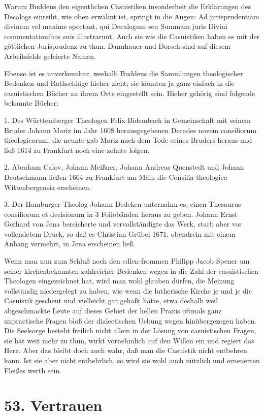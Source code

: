 Warum Buddeus den eigentlichen Casuistiken insonderheit die Erklärungen des Decalogs einreiht, wie oben erwähnt
ist, springt in die Augen: Ad jurisprudentiam divinam vel maxime spectant, qui Decalogum seu Summam juris Divini commentationibus suis illustrarunt. Auch sie wie die Casuistiken haben es mit der göttlichen Jurisprudenz zu thun. Dannhauer und Dorsch sind auf diesem Arbeitsfelde gefeierte Namen.

Ebenso ist es unverkennbar, weshalb Buddeus die Sammlungen theologischer Bedenken und Rathschläge hieher zieht; sie könnten ja ganz einfach in die casuistischen Bücher an ihrem Orte eingestellt sein. Hieher gehörig sind folgende bekannte Bücher:

1. Des Württemberger Theologen Felix Bidembach in Gemeinschaft mit seinem Bruder Johann Moriz im Jahr 1608 herausgegebenen Decades novem consiliorum theologicorum; die neunte gab Moriz nach dem Tode seines Bruders heraus und ließ 1614 zu Frankfurt noch eine zehnte folgen.

2. Abraham Calov, Johann Meißner, Johann Andreas Quenstedt und Johann Deutschmann ließen 1664 zu Frankfurt am Main die Consilia theologica Wittenbergensia erscheinen.

3. Der Hamburger Theolog Johann Dedeken unternahm es, einen Thesaurus consiliorum et decisionum in 3 Foliobänden heraus zu geben. Johann Ernst Gerhard von Jena bereicherte und vervollständigte das Werk, starb aber vor vollendetem Druck, so daß es Christian Grübel 1671, obendrein mit einem Anhang vermehrt, in Jena erscheinen ließ.

Wenn man nun zum Schluß noch den edlen-frommen Philipp Jacob Spener um seiner kirchenbekannten
zahlreicher Bedenken wegen in die Zahl der casuistischen Theologen eingezeichnet hat, wird man wohl glauben dürfen, die Meinung vollständig niedergelegt zu haben, wie wenn die lutherische Kirche je und je die Casuistik gescheut und vielleicht gar gehaßt hätte, etwa deshalb weil abgeschmackte Leute auf dieses Gebiet der hellen Praxis oftmals ganz unpractische Fragen bloß der dialectischen Uebung wegen hinübergezogen haben. Die Seelsorge besteht freilich nicht allein in der Lösung von casuistischen Fragen, sie hat weit mehr zu thun, wirkt vornehmlich auf den Willen ein und regiert das Herz. Aber das bleibt doch auch wahr, daß man die Casuistik nicht entbehren kann. Ist sie aber nicht entbehrlich, so wird sie wohl auch nützlich und erneuerten Fleißes werth sein.

\section{53. Vertrauen}

